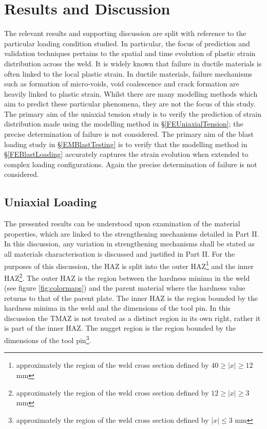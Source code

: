 \section{Results and Discussion}
\label{RAD}
The relevant results and supporting discussion are split with reference to the particular loading condition studied. In particular, the focus of prediction and validation techniques pertains to the spatial and time evolution of plastic strain distribution across the weld. It is widely known that failure in ductile materials is often linked to the local plastic strain. In ductile materials, failure mechanisms such as formation of micro-voids, void coalescence and crack formation are heavily linked to plastic strain. Whilst there are many modelling methods which aim to predict these particular phenomena, they are not the focus of this study. The primary aim of the uniaxial tension study is to verify the prediction of strain distribution made using the modelling method in \S\ref{FEUniaxialTension}; the precise determination of failure is not considered. The primary aim of the blast loading study in \S\ref{EMBlastTesting} is to verify that the modelling method in \S\ref{FEBlastLoading} accurately captures the strain evolution when extended to complex loading configurations. Again the precise determination of failure is not considered.

\subsection{Uniaxial Loading}
\label{RADUniaxialLoading}
The presented results can be understood upon examination of the material properties, which are linked to the strengthening mechanisms detailed in Part II. In this discussion, any variation in strengthening mechanisms shall be stated as all materials characterisation is discussed and justified in Part II. For the purposes of this discussion, the HAZ is split into the outer HAZ\footnote{approximately the region of the weld cross section defined by $40\geq|x|\geq12$ mm} and the inner HAZ\footnote{approximately the region of the weld cross section defined by $12\geq|x|\geq3$ mm}. The outer HAZ is the region between the hardness minima in the weld (see figure \ref{fig:colormaps}) and the parent material where the hardness value returns to that of the parent plate. The inner HAZ is the region bounded by the hardness minima in the weld and the dimensions of the tool pin. In this discussion the TMAZ is not treated as a distinct region in its own right, rather it is part of the inner HAZ. The nugget region is the region bounded by the dimensions of the tool pin\footnote{approximately the region of the weld cross section defined by $|x|\leq3$ mm}.

